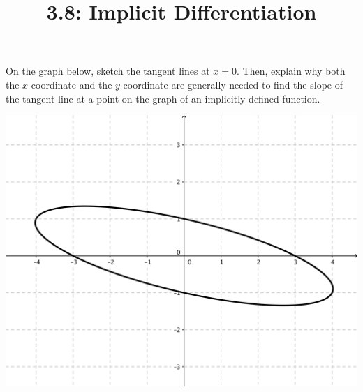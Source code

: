 \documentclass[nooutcomes]{ximera}
\title{3.8: Implicit Differentiation}
\begin{document}
\begin{abstract}		\end{abstract}
\maketitle

\begin{problem}
On the graph below, sketch the tangent lines at $x=0$.  Then, explain why both the $x$-coordinate and the $y$-coordinate are generally needed to find the slope of the tangent line at a point on the graph of an implicitly defined function.
\begin{image}
\includegraphics[scale=.5]{figure1.png}
\end{image}



\end{problem}
\end{document}
